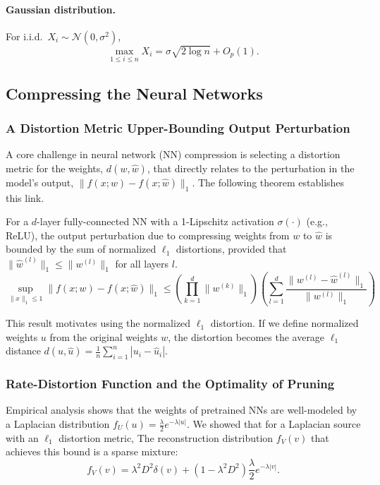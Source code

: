 \paragraph{Gaussian distribution.}
For i.i.d.\ \(X_i\sim\mathcal N(0,\sigma^2)\),
\[
\max_{1\le i\le n} X_i
      =\sigma\sqrt{2\log n}+O_p(1).
\]

\subsection{Compressing the Neural Networks}

\subsubsection*{A Distortion Metric Upper-Bounding Output Perturbation}

A core challenge in neural network (NN) compression is selecting a distortion metric for the weights, $d(w, \hat{w})$, that directly relates to the perturbation in the model's output, $\|f(x;w) - f(x;\hat{w})\|_1$. The following theorem establishes this link.

\begin{theorem}
For a $d$-layer fully-connected NN with a 1-Lipschitz activation $\sigma(\cdot)$ (e.g., ReLU), the output perturbation due to compressing weights from $w$ to $\hat{w}$ is bounded by the sum of normalized $\ell_1$ distortions, provided that $\|\hat{w}^{(l)}\|_1 \le \|w^{(l)}\|_1$ for all layers $l$.
\[
\sup_{\|x\|_1 \le 1} \|f(x;w) - f(x;\hat{w})\|_1 \le \left(\prod_{k=1}^{d}\|w^{(k)}\|_1\right) \left(\sum_{l=1}^{d} \frac{\|w^{(l)}-\hat{w}^{(l)}\|_1}{\|w^{(l)}\|_1}\right)
\]
\end{theorem}

This result motivates using the normalized $\ell_1$ distortion. If we define normalized weights $u$ from the original weights $w$, the distortion becomes the average $\ell_1$ distance $d(u, \hat{u}) = \frac{1}{n}\sum_{i=1}^{n}|u_i - \hat{u}_i|$.

\subsubsection*{Rate-Distortion Function and the Optimality of Pruning}

Empirical analysis shows that the weights of pretrained NNs are well-modeled by a Laplacian distribution $f_U(u) = \frac{\lambda}{2}e^{-\lambda|u|}$. We showed that for a Laplacian source with an $\ell_1$ distortion metric, The reconstruction distribution $f_V(v)$ that achieves this bound is a sparse mixture:
\[
    f_V(v) = \lambda^2 D^2 \delta(v) + (1 - \lambda^2 D^2) \frac{\lambda}{2}e^{-\lambda|v|}.
\]

